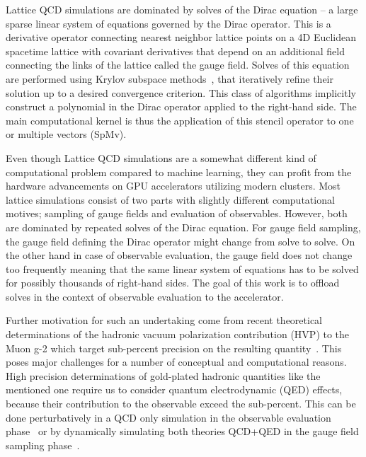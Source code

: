 Lattice QCD simulations are dominated by solves of the Dirac equation -- a large sparse linear system of equations governed by the Dirac operator.
This is a derivative operator connecting nearest neighbor lattice points on a 4D Euclidean spacetime lattice with covariant derivatives that depend on an additional field connecting the links of the lattice called the gauge field.
Solves of this equation are performed using Krylov subspace methods~\cite{krylov1931numerical,book:saad2003iterative}, that iteratively refine their solution up to a desired convergence criterion.
This class of algorithms implicitly construct a polynomial in the Dirac operator applied to the right-hand side.
The main computational kernel is thus the application of this stencil operator to one or multiple vectors (SpMv).

Even though Lattice QCD simulations are a somewhat different kind of computational problem compared to machine learning, they can profit from the hardware advancements
on GPU accelerators utilizing modern clusters.
Most lattice simulations consist of two parts with slightly different computational motives; sampling of gauge fields and evaluation of observables.
However, both are dominated by repeated solves of the Dirac equation.
For gauge field sampling, the gauge field defining the Dirac operator might change from solve to solve.
On the other hand in case of observable evaluation, the gauge field does not change too frequently meaning that the same linear system of equations has to be solved for possibly thousands of right-hand sides.
The goal of this work is to offload solves in the context of observable evaluation to the accelerator.

Further motivation for such an undertaking come from recent theoretical determinations of the hadronic vacuum polarization contribution (HVP) to the Muon g-2 which target sub-percent precision on the resulting quantity~\cite{RBC_2024, bmw_2017, Djukanovic:2024cmq, bmw_2024, milc_gm2, ExtendedTwistedMass:2022jpw, FermilabLattice:2024yho,snowmass:2020,snowmass:2025}.
This poses major challenges for a number of conceptual and computational reasons.
High precision determinations of gold-plated hadronic quantities like the mentioned one require us to consider quantum electrodynamic (QED) effects, because their contribution to the observable exceed the sub-percent.
This can be done perturbatively in a QCD only simulation in the observable evaluation phase~\cite{deDivitiis:2011eh,deDivitiis:2013xla} or by dynamically simulating both theories QCD+QED in the gauge field sampling phase~\cite{Lucini:2015,10.1143/PTP.120.413,PhysRevLett.117.072002,Blum:2017cer,Feng:2018qpx}.

